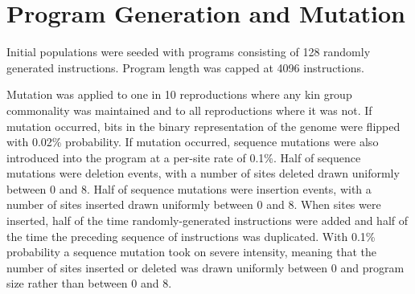 \section{Program Generation and Mutation}

Initial populations were seeded with programs consisting of 128 randomly generated instructions.
Program length was capped at 4096 instructions.

Mutation was applied to one in 10 reproductions where any kin group commonality was maintained and to all reproductions where it was not.
If mutation occurred, bits in the binary representation of the genome were flipped with 0.02\% probability.
If mutation occurred, sequence mutations were also introduced into the program at a per-site rate of 0.1\%.
Half of sequence mutations were deletion events, with a number of sites deleted drawn uniformly between 0 and 8.
Half of sequence mutations were insertion events, with a number of sites inserted drawn uniformly between 0 and 8.
When sites were inserted, half of the time randomly-generated instructions were added and half of the time the preceding sequence of instructions was duplicated.
With 0.1\% probability a sequence mutation took on severe intensity, meaning that the number of sites inserted or deleted was drawn uniformly between 0 and program size rather than between 0 and 8.
